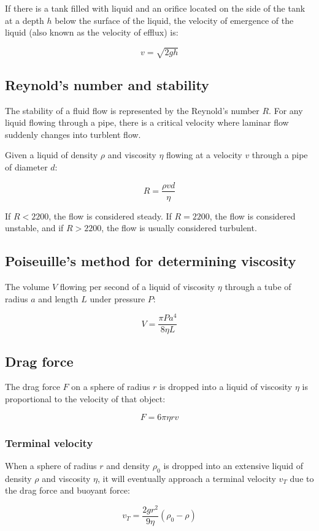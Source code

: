 \documentclass[12pt]{article}
\begin{document}
If there is a tank filled with liquid and an orifice located on the side of the tank at a depth $h$ below the surface of the liquid, the velocity of emergence of the liquid (also known as the velocity of efflux) is:

\[
\boxed{
v = \sqrt{2gh}
}
\]

\newpage

\subsection{Reynold's number and stability}

The stability of a fluid flow is represented by the Reynold's number $R$.
For any liquid flowing through a pipe, there is a critical velocity where laminar flow suddenly changes into turblent flow.

Given a liquid of density $\rho$ and viscosity $\eta$ flowing at a velocity $v$ through a pipe of diameter $d$:

\[
\boxed{
R = \frac{\rho v d}{\eta}
}
\]

If $R < 2200$, the flow is considered steady. If $R = 2200$, the flow is considered unstable, and if $R > 2200$, the flow is usually considered turbulent.

\subsection{Poiseuille's method for determining viscosity}

The volume $V$ flowing per second of a liquid of viscosity $\eta$ through a tube of radius $a$ and length $L$ under pressure $P$:

\[
\boxed{
V = \frac{\pi P a^4}{8\eta L}
}
\]

\subsection{Drag force}

The drag force $F$ on a sphere of radius $r$ is dropped into a liquid of viscosity $\eta$ is proportional to the velocity of that object:

\[
\boxed{
F = 6 \pi \eta r v
}
\]

\subsubsection{Terminal velocity}

When a sphere of radius $r$ and density $\rho_0$ is dropped into an extensive liquid of density $\rho$ and viscosity $\eta$, it will eventually approach a terminal velocity $v_T$ due to the drag force and buoyant force:

\[
\boxed{
v_T = \frac{2gr^2}{9\eta}(\rho_0 - \rho)
}
\]
\end{document}

